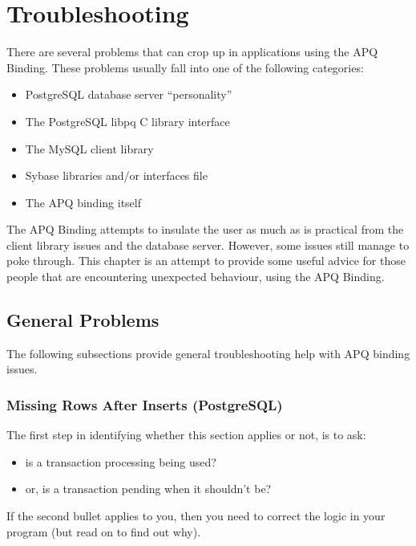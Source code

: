 \documentclass[english,letterpaper]{book}
\begin{document}
\chapter{Troubleshooting}

There are several problems that can crop up in applications using
the APQ Binding. These problems usually fall into one of the following
categories:

\begin{itemize}
   \item PostgreSQL database server ``personality''
   \item The PostgreSQL libpq C library interface
   \item The MySQL client library
   \item Sybase libraries and/or interfaces file
   \item The APQ binding itself
\end{itemize}

The APQ Binding attempts to insulate the user as much as is practical
from the client library issues and the database server. However, some
issues still manage to poke through. This chapter is an attempt to
provide some useful advice for those people that are encountering
unexpected behaviour, using the APQ Binding.


\section{General Problems}

The following subsections provide general troubleshooting help with
APQ binding issues.


\subsection{Missing Rows After Inserts (PostgreSQL)}

The first step in identifying whether this section applies or not,
is to ask:

\begin{itemize}
   \item is a transaction processing being used?
   \item or, is a transaction pending when it shouldn't be?
\end{itemize}

If the second bullet applies to you, then you need to correct the
logic in your program (but read on to find out why).
\end{document}
